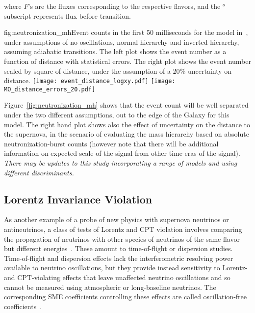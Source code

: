 where $F$'s are the fluxes corresponding to the respective flavors,
and the $^o$ subscript represents flux before transition.

\begin{dunefigure}[MH1]{fig:neutronization_mh}{Event counts in the
    first 50 milliseconds for the model in~\cite{Huedepohl}, under
    assumptions of no oscillations, normal hierarchy and inverted
    hierarchy, assuming adiabatic  transitions.  The left plot
    shows the event number as a function of distance with statistical
    errors.  The right plot
    shows the event number scaled by square of distance, under the
    assumption of a 20\% uncertainty on distance. }
\texttt{[image: event\_distance\_logxy.pdf]}
\texttt{[image: MO\_distance\_errors\_20.pdf]}
\end{dunefigure}

Figure~\ref{fig:neutronization_mh} shows that the event count will be
well separated under the two different assumptions, out to the edge of
the Galaxy for this model.  The right hand plot shows also the effect of uncertainty
on the distance to the supernova, in the scenario of evaluating the
mass hierarchy based on absolute neutronization-burst counts (however
note that there will be additional information on expected scale of
the signal from other time eras of the signal). \textit{There may be
  updates to this study incorporating a range of models and using
  different discriminants.}


\subsection{Lorentz Invariance Violation}

As another example of a probe of new physics with supernova neutrinos or antineutrinos,
a class of tests of Lorentz and CPT violation involves comparing the propagation of neutrinos with other species of neutrinos of the same flavor but different energies~\cite{Kostelecky:2003cr,Kostelecky:2003xn,Kostelecky:2011gq,Diaz:2009qk}. These amount to time-of-flight or dispersion studies.
Time-of-flight and dispersion effects lack the interferometric resolving power available to neutrino oscillations, but they provide instead sensitivity to Lorentz- and CPT-violating effects that  leave unaffected neutrino oscillations
and so cannot be measured using atmospheric or long-baseline neutrinos.
The corresponding SME coefficients controlling these effects are called oscillation-free coefficients~\cite{Kostelecky:2011gq}.

